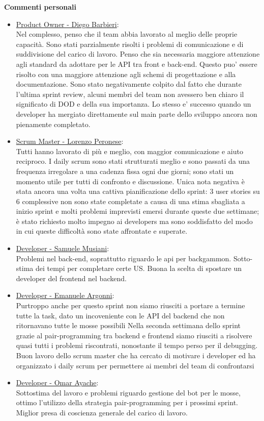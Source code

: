 \documentclass{article}
\begin{document}
\textbf{Commenti personali}
\begin{itemize}
    \item \underline{Product Owner - Diego Barbieri}: \\
    Nel complesso, penso che il team abbia lavorato al meglio delle proprie capacità. Sono stati parzialmente risolti i problemi di comunicazione
    e di suddivisione del carico di lavoro. Penso che sia necessaria maggiore attenzione agli standard da adottare per le API tra front e back-end.
    Questo puo' essere risolto con una maggiore attenzione agli schemi di progettazione e alla documentazione.
    Sono stato negativamente colpito dal fatto che durante l'ultima sprint review, alcuni membri del team non avessero ben chiaro il significato di DOD
    e della sua importanza. Lo stesso e' successo quando un developer ha mergiato direttamente sul main parte dello sviluppo ancora non pienamente completato.

    \item \underline{Scrum Master - Lorenzo Peronese}: \\
    Tutti hanno lavorato di più e meglio, con maggior comunicazione e aiuto reciproco.
    I daily scrum sono stati strutturati meglio e sono passati da una frequenza irregolare a una cadenza fissa ogni due giorni; sono stati un momento utile per
    tutti di confronto e discussione.
    Unica nota negativa è stata ancora una volta una cattiva pianificazione dello sprint: 3 user stories su 6 complessive non sono state
    completate a causa di una stima sbagliata a inizio sprint e molti problemi imprevisti emersi durante queste due settimane; è stato richiesto molto impegno 
    ai developers ma sono soddisfatto del modo in cui queste difficoltà sono state affrontate e superate.

    \item \underline{Developer - Samuele Musiani}: \\
    Problemi nel back-end, soprattutto riguardo le api per backgammon. Sotto-stima dei tempi per completare certe US. Buona la scelta di spostare
    un developer del frontend nel backend.

    \item \underline{Developer - Emanuele Argonni}: \\
    Purtroppo anche per questo sprint non siamo riusciti a portare a termine tutte la task,
    dato un incoveniente con le API del backend che non ritornavano tutte le mosse possibili
    Nella seconda settimana dello sprint grazie al pair-programming tra backend e frontend siamo riusciti a risolvere quasi tutti i problemi riscontrati,
    nonostante il tempo perso per il debugging.
    Buon lavoro dello scrum master che ha cercato di motivare i developer ed ha organizzato i daily scrum per permettere ai membri del team di confrontarsi
    
    \item \underline{Developer - Omar Ayache}:\\
    Sottostima del lavoro e problemi riguardo gestione del bot per le mosse, ottimo l'utilizzo della strategia pair-programming per i prossimi sprint.
    Miglior presa di coscienza generale del carico di lavoro.    
\end{itemize} 
\end{document}
